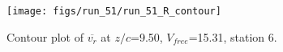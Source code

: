 \begin{figure}[H]
\centering
\texttt{[image: figs/run\_51/run\_51\_R\_contour]}
\caption{Contour plot of $\overline{v_{r}}$ at $z/c$=9.50, $V_{free}$=15.31, station 6.}
\label{fig:run_51_R_contour}
\end{figure}


